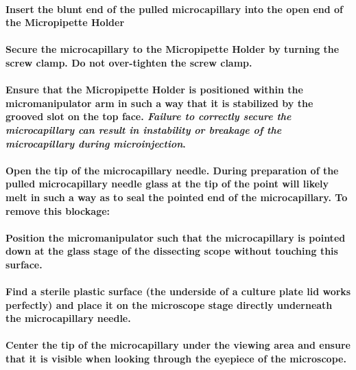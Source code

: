 \documentclass[11pt]{article}
\begin{document}
\paragraph{{\sffamily } Insert the blunt end of the pulled microcapillary into the open end of the Micropipette Holder}
\label{sec:orgheadline30}
\paragraph{{\sffamily } Secure the microcapillary to the Micropipette Holder by turning the screw clamp. Do not over-tighten the screw clamp.}
\label{sec:orgheadline31}
\paragraph{{\sffamily } Ensure that the Micropipette Holder is positioned within the micromanipulator arm in such a way that it is stabilized by the grooved slot on the top face. \emph{Failure to correctly secure the microcapillary can result in instability or breakage of the microcapillary during microinjection}.}
\label{sec:orgheadline32}
\paragraph{{\sffamily } Open the tip of the microcapillary needle. During preparation of the pulled microcapillary needle glass at the tip of the point will likely melt in such a way as to seal the pointed end of the microcapillary. To remove this blockage:}
\label{sec:orgheadline33}
\paragraph{{\sffamily } Position the micromanipulator such that the microcapillary is pointed down at the glass stage of the dissecting scope without touching this surface.}
\label{sec:orgheadline34}
\paragraph{{\sffamily } Find a sterile plastic surface (the underside of a culture plate lid works perfectly) and place it on the microscope stage directly underneath the microcapillary needle.}
\label{sec:orgheadline35}
\paragraph{{\sffamily } Center the tip of the microcapillary under the viewing area and ensure that it is visible when looking through the eyepiece of the microscope.}
\label{sec:orgheadline36}
\end{document}
